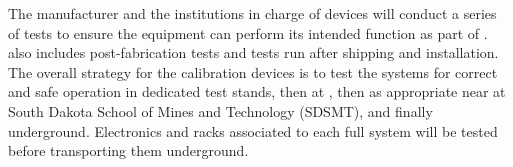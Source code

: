 

The manufacturer and the institutions in charge of devices will conduct a series of tests to ensure the equipment can perform its intended function as part of .  also includes post-fabrication tests and tests run after shipping and installation. The overall strategy for the calibration devices is to test the systems for correct and safe operation in dedicated test stands, then at , then as appropriate near  at South Dakota School of Mines and Technology (SDSMT), and finally underground. Electronics and racks associated to each full system will be tested before transporting them underground.

